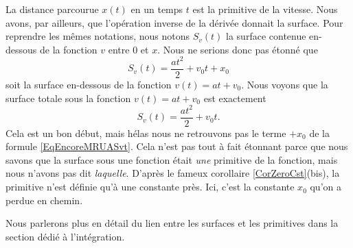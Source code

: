 La distance parcourue $x(t)$ en un temps $t$ est la primitive de la vitesse. Nous avons, par ailleurs, que l'opération inverse de la dérivée donnait la surface. Pour reprendre les mêmes notations, nous notons $S_v(t)$ la surface contenue en-dessous de la fonction $v$ entre $0$ et $x$. Nous ne serions donc pas étonné que
\begin{equation}        \label{EqEncoreMRUASvt}
    S_v(t) = \frac{ at^2 }{ 2 }+v_0t+x_0
\end{equation}
soit la surface en-dessous de la fonction $v(t)=at+v_0$. Nous voyons que la surface totale sous la fonction $v(t)=at+v_0$ est exactement
\begin{equation}
    S_v(t)=\frac{ at^2 }{ 2 }+v_0t.
\end{equation}
Cela est un bon début, mais hélas nous ne retrouvons pas le terme \og $+x_0$\fg{} de la formule \eqref{EqEncoreMRUASvt}. Cela n'est pas tout à fait étonnant parce que nous savons que la surface sous une fonction était \emph{une} primitive de la fonction, mais nous n'avons pas dit \emph{laquelle}. D'après le fameux corollaire \ref{CorZeroCst}(bis), la primitive n'est définie qu'à une constante près. Ici, c'est la constante $x_0$ qu'on a perdue en chemin.

Nous parlerons plus en détail du lien entre les surfaces et les primitives dans la section dédié à l'intégration.


